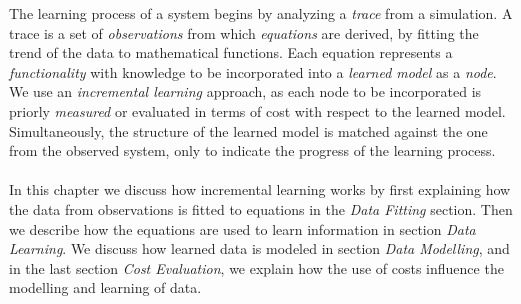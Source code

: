 The learning process of a system begins by analyzing a \textit{trace} from a simulation.
%
A trace is a set of \textit{observations} from which \textit{equations} are derived, by fitting the trend of the data to mathematical functions.
%
Each equation represents a \textit{functionality} with knowledge to be incorporated into a \textit{learned model} as a \textit{node}. 
%
We use an \textit{incremental learning} approach, as each node to be incorporated is priorly \textit{measured} or evaluated in terms of cost with respect to the learned model.
%
Simultaneously, the structure of the learned model is matched against the one from the observed system, only to indicate the progress of the learning process. \\ \\
%
In this chapter we discuss how incremental learning works by first explaining how the data from observations is fitted to equations in the \textit{Data Fitting} section. Then we describe how the equations are used to learn information in section \textit{Data Learning}. We discuss how learned data is modeled in section \textit{Data Modelling}, and in the last section \textit{Cost Evaluation}, we explain how the use of costs influence the modelling and learning of data. 

